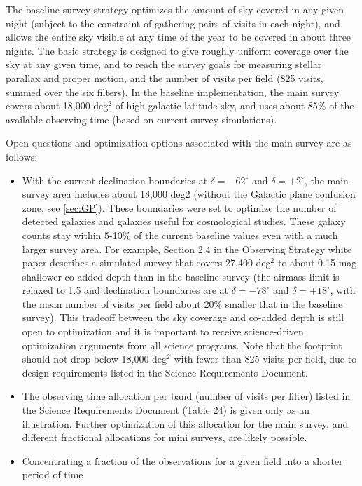 \documentclass[DM,lsstdraft,toc,usenatbib]{lsstdoc}
\begin{document}
The baseline survey strategy optimizes the amount of sky covered in any given night (subject to 
the constraint of gathering pairs of visits in each night), 
and allows the entire sky visible at any time of the year to be covered in about three nights. 
The basic strategy is designed to give roughly uniform coverage over the sky at any given time, and to reach
the survey goals for measuring stellar parallax and proper motion, and the number of visits per 
field (825 visits, summed over the six filters). In the baseline implementation, the main survey 
covers about 18,000 deg$^2$ of high galactic latitude sky, and uses about 85\% of the available 
observing time (based on current survey simulations). 

Open questions and optimization options associated with the main survey are as follows: 
\begin{itemize}
\item With the current declination boundaries at $\delta = -62^\circ$ and $\delta = +2^\circ$,
the main survey area includes about 18,000 deg$2$ (without the Galactic plane 
confusion zone, see \ref{sec:GP}). These boundaries were set to optimize the number of
detected galaxies and galaxies useful for cosmological studies. These galaxy counts 
stay within 5-10\% of the current baseline values even with a much larger survey area. 
For example, Section 2.4 in the Observing Strategy white paper describes a simulated survey
that covers 27,400 deg$^2$ to about 0.15 mag shallower co-added depth than in the baseline 
survey (the airmass limit is relaxed to 1.5 and declination boundaries are at $\delta = -78^\circ$ 
and $\delta = +18^\circ$, with the mean number of visits per field about 20\% smaller that
in the baseline survey). This tradeoff between the sky coverage and co-added depth is still
open to optimization and it is important to receive science-driven optimization arguments
from all science programs.  Note that the footprint should not drop below 18,000 deg$^2$ with fewer
than 825 visits per field, due to design requirements listed in the Science Requirements Document. 
\item The observing time allocation per band (number of visits per filter) listed in the Science Requirements Document
(Table 24) is given only as an illustration. Further optimization of this allocation for the main 
survey, and different fractional allocations for mini surveys, are likely possible. 
\item Concentrating a fraction of the observations for a given field into a shorter period of time

\end{itemize}
\end{document}
